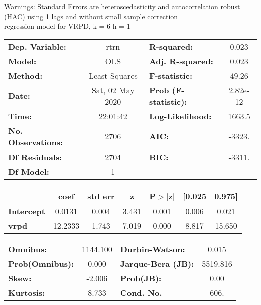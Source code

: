 Warnings: \newline
 [1] Standard Errors are heteroscedasticity and autocorrelation robust (HAC) using 1 lags and without small sample correction\\ 

regression model for VRPD, k = 6 h = 1\begin{center}
\begin{tabular}{lclc}
\toprule
\textbf{Dep. Variable:}    &       rtrn       & \textbf{  R-squared:         } &     0.023   \\
\textbf{Model:}            &       OLS        & \textbf{  Adj. R-squared:    } &     0.023   \\
\textbf{Method:}           &  Least Squares   & \textbf{  F-statistic:       } &     49.26   \\
\textbf{Date:}             & Sat, 02 May 2020 & \textbf{  Prob (F-statistic):} &  2.82e-12   \\
\textbf{Time:}             &     22:01:42     & \textbf{  Log-Likelihood:    } &    1663.5   \\
\textbf{No. Observations:} &        2706      & \textbf{  AIC:               } &    -3323.   \\
\textbf{Df Residuals:}     &        2704      & \textbf{  BIC:               } &    -3311.   \\
\textbf{Df Model:}         &           1      & \textbf{                     } &             \\
\bottomrule
\end{tabular}
\begin{tabular}{lcccccc}
                   & \textbf{coef} & \textbf{std err} & \textbf{z} & \textbf{P$> |$z$|$} & \textbf{[0.025} & \textbf{0.975]}  \\
\midrule
\textbf{Intercept} &       0.0131  &        0.004     &     3.431  &         0.001        &        0.006    &        0.021     \\
\textbf{vrpd}      &      12.2333  &        1.743     &     7.019  &         0.000        &        8.817    &       15.650     \\
\bottomrule
\end{tabular}
\begin{tabular}{lclc}
\textbf{Omnibus:}       & 1144.100 & \textbf{  Durbin-Watson:     } &    0.015  \\
\textbf{Prob(Omnibus):} &   0.000  & \textbf{  Jarque-Bera (JB):  } & 5519.816  \\
\textbf{Skew:}          &  -2.006  & \textbf{  Prob(JB):          } &     0.00  \\
\textbf{Kurtosis:}      &   8.733  & \textbf{  Cond. No.          } &     606.  \\
\bottomrule
\end{tabular}
\end{center}

